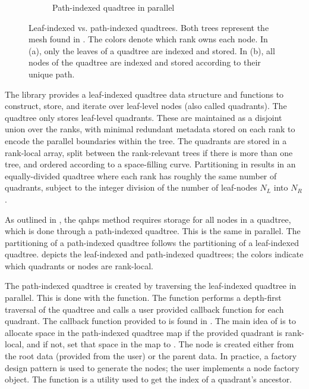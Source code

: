 \begin{figure}
\begin{subfigure}[t]{1\textwidth}
        \caption{Path-indexed quadtree in parallel}
    \end{subfigure}
    \caption{Leaf-indexed vs. path-indexed quadtrees. Both trees represent the mesh found in . The colors denote which rank owns each node. In (a), only the leaves of a quadtree are indexed and stored. In (b), all nodes of the quadtree are indexed and stored according to their unique path.}
    \label{fig:quadtree_indexing}
\end{figure}

The \pforest library provides a leaf-indexed quadtree data structure and functions to construct, store, and iterate over leaf-level nodes (also called quadrants). The \pforest quadtree only stores leaf-level quadrants. These are maintained as a disjoint union over the ranks, with minimal redundant metadata stored on each rank to encode the parallel boundaries within the tree. The quadrants are stored in a rank-local array, split between the rank-relevant trees if there is more than one tree, and ordered according to a space-filling curve. Partitioning in \pforest results in an equally-divided quadtree where each rank has roughly the same number of quadrants, subject to the integer division of the number of leaf-nodes $N_{L}$ into $N_{R}$.

As outlined in , the \gls{qahps} method requires storage for all nodes in a quadtree, which is done through a path-indexed quadtree. This is the same in parallel. The partitioning of a path-indexed quadtree follows the partitioning of a leaf-indexed quadtree.  depicts the leaf-indexed and path-indexed quadtrees; the colors indicate which quadrants or nodes are rank-local.

The path-indexed quadtree is created by traversing the leaf-indexed quadtree in parallel. This is done with the  function. The  function performs a depth-first traversal of the quadtree and calls a user provided callback function for each quadrant. The callback function provided to  is found in . The main idea of  is to allocate space in the path-indexed quadtree map if the provided quadrant is rank-local, and if not, set that space in the map to . The node is created either from the root data (provided from the user) or the parent data. In practice, a factory design pattern is used to generate the nodes; the user implements a node factory object. The function  is a utility used to get the index of a quadrant's ancestor.

